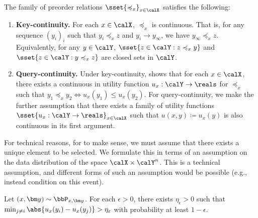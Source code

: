 \begin{assumption}\label{ass:qk_cts}
  The family of preorder relations $\sset{\preceq_x}_{x \in \calX}$ satisfies the following:
  \begin{enumerate}
    \item \textbf{Key-continuity.} For each $x \in \calX$, $\preceq_x$ is continuous. That is, for any sequence $(y_i)_i$ such that $y_i \preceq_x z$ and $y_i \to y_{\infty}$, we have $y_\infty \preceq_x z$. Equivalently, for any $y \in \calY$, $\sset{z \in \calY : z \preceq_x y}$ and $\sset{z \in \calY : y \preceq_x z}$ are closed sets in $\calY$.
    \item \textbf{Query-continuity.} Under key-continuity, \citet{debreu1954representation} shows that for each $x \in \calX$, there exists a continuous in utility function $u_x: \calY \to \reals$ for $\preceq_x$ such that $y_1 \preceq_x y_2 \iff u_x(y_1) \leq u_x(y_2)$. For query-continuity, we make the further assumption that there exists a family of utility functions $\sset{u_x: \calY \to \reals}_{x \in \calX}$ such that  $u(x, y) \coloneq u_x(y)$ is also continuous in its first argument.
  \end{enumerate}
\end{assumption}

For technical reasons, for  to make sense, we must assume that there exists a unique element to be selected. We formulate this in terms of an assumption on the data distribution of the space $\calX \times \calY^n$. This is a technical assumption, and different forms of such an assumption would be possible (e.g., instead condition on this event).
\begin{assumption}\label{ass:select_unique}
  Let $(x, \y) \sim \bbP_{x,\y}$. For each $\epsilon > 0$, there exists $\eta_\epsilon > 0$ such that $\min_{j \neq i} \abs{u_x(y_i) - u_x(y_j)} > \eta_\epsilon$ with probability at least $1 - \epsilon$.
\end{assumption}


